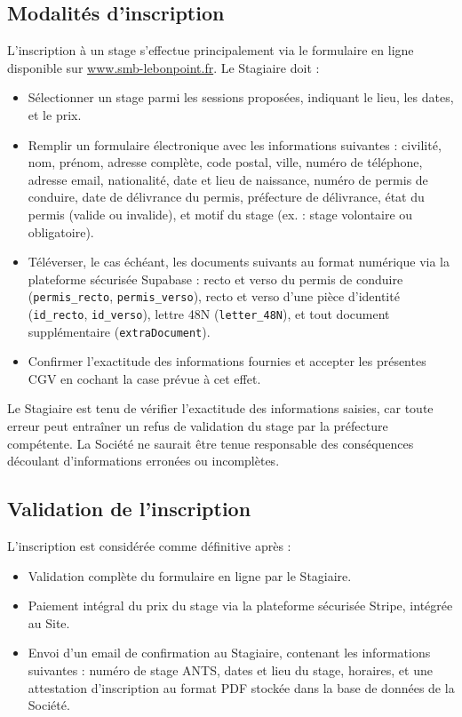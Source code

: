 \documentclass[a4paper,12pt]{article}
\begin{document}
\subsection{Modalités d'inscription}
L'inscription à un stage s'effectue principalement via le formulaire en ligne disponible sur \href{https://www.smb-lebonpoint.fr}{www.smb-lebonpoint.fr}. Le Stagiaire doit :
\begin{itemize}
    \item Sélectionner un stage parmi les sessions proposées, indiquant le lieu, les dates, et le prix.
    \item Remplir un formulaire électronique avec les informations suivantes : civilité, nom, prénom, adresse complète, code postal, ville, numéro de téléphone, adresse email, nationalité, date et lieu de naissance, numéro de permis de conduire, date de délivrance du permis, préfecture de délivrance, état du permis (valide ou invalide), et motif du stage (ex. : stage volontaire ou obligatoire).
    \item Téléverser, le cas échéant, les documents suivants au format numérique via la plateforme sécurisée Supabase : recto et verso du permis de conduire (\texttt{permis\_recto}, \texttt{permis\_verso}), recto et verso d'une pièce d'identité (\texttt{id\_recto}, \texttt{id\_verso}), lettre 48N (\texttt{letter\_48N}), et tout document supplémentaire (\texttt{extraDocument}).
    \item Confirmer l'exactitude des informations fournies et accepter les présentes CGV en cochant la case prévue à cet effet.
\end{itemize}

Le Stagiaire est tenu de vérifier l'exactitude des informations saisies, car toute erreur peut entraîner un refus de validation du stage par la préfecture compétente. La Société ne saurait être tenue responsable des conséquences découlant d'informations erronées ou incomplètes.

\subsection{Validation de l'inscription}
L'inscription est considérée comme définitive après :
\begin{itemize}
    \item Validation complète du formulaire en ligne par le Stagiaire.
    \item Paiement intégral du prix du stage via la plateforme sécurisée Stripe, intégrée au Site.
    \item Envoi d'un email de confirmation au Stagiaire, contenant les informations suivantes : numéro de stage ANTS, dates et lieu du stage, horaires, et une attestation d'inscription au format PDF stockée dans la base de données de la Société.
\end{itemize}
\end{document}
